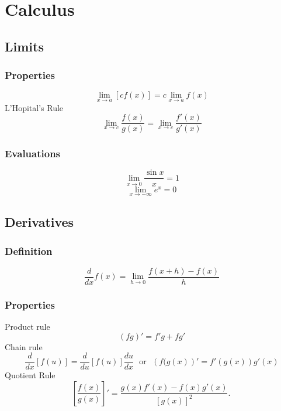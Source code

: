 \documentclass{article}
\begin{document}
\section{Calculus}
	\subsection{Limits}
		\subsubsection{Properties}
			\begin{equation}
				\mathop {\lim }\limits_{x \to a} \left[ cf(x) \right] = c\mathop{\lim }\limits_{x \to a} f(x)
			\end{equation}
			L'Hopital's Rule
			\begin{equation}
				\mathop {\lim }\limits_{x \to c} \frac{{f\left( x \right)}}{{g\left( x \right)}} = \mathop {\lim }\limits_{x \to c} \frac{{f'\left( x \right)}}{{g'\left( x \right)}}
			\end{equation}
		\subsubsection{Evaluations}
			\begin{equation}
				\mathop {\lim }\limits_{x \to 0} \frac{{\sin x}}{x} = 1
			\end{equation}
			\begin{equation}
				\mathop {\lim }\limits_{x \to - \infty } e^x = 0
			\end{equation}
	\subsection{Derivatives}
		\subsubsection{Definition}
			\begin{equation}
				\frac{d}{{dx}}f\left( x \right) = \mathop {\lim }\limits_{h \to 0} \frac{{f\left( {x + h } \right) - f\left( x \right)}}{h }
			\end{equation}
		\subsubsection{Properties}
			Product rule
			\begin{equation}
				\left(fg\right)'=f'g+fg'
			\end{equation}
			Chain rule
			\begin{equation}
				\frac{d}{{dx}}\left[ {f\left( u \right)} \right] = \frac{d}{{du}}\left[ {f\left( u \right)} \right]\frac{{du}}{{dx}} \ \ \ \mbox{or} \ \ \ \left(f(g(x)\right)'=f'\left(g(x)\right)g'(x)
			\end{equation}
			Quotient Rule
			\begin{equation}
				\left[\frac{f(x)}{g(x)}\right]'=\frac{g(x)f'(x)-f(x)g'(x)}{[g(x)]^2}.\
			\end{equation}
\end{document}
